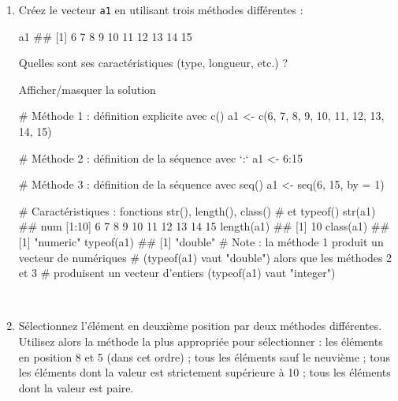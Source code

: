 \documentclass[12pt,]{article}
\newenvironment{Shaded}{}{}
\newcommand{\KeywordTok}[1]{\textcolor[rgb]{0.00,0.00,1.00}{{#1}}}
\newcommand{\DataTypeTok}[1]{{#1}}
\newcommand{\DecValTok}[1]{{#1}}
\newcommand{\StringTok}[1]{\textcolor[rgb]{0.00,0.50,0.50}{{#1}}}
\newcommand{\CommentTok}[1]{\textcolor[rgb]{0.00,0.50,0.00}{{#1}}}
\newcommand{\NormalTok}[1]{{#1}}
\begin{document}
\begin{enumerate}
\def\labelenumi{\alph{enumi}.}
\item
  Créez le vecteur \texttt{a1} en utilisant trois méthodes différentes :

\begin{Shaded}
\begin{Highlighting}[]
\NormalTok{a1}
\NormalTok{##  [1]  6  7  8  9 10 11 12 13 14 15}
\end{Highlighting}
\end{Shaded}

  Quelles sont ses caractéristiques (type, longueur, etc.) ?

  Afficher/masquer la solution

  \hypertarget{sol1}{}
\begin{Shaded}
\begin{Highlighting}[]
\CommentTok{# Méthode 1 : définition explicite avec c()}
\NormalTok{a1 <-}\StringTok{ }\KeywordTok{c}\NormalTok{(}\DecValTok{6}\NormalTok{, }\DecValTok{7}\NormalTok{, }\DecValTok{8}\NormalTok{, }\DecValTok{9}\NormalTok{, }\DecValTok{10}\NormalTok{, }\DecValTok{11}\NormalTok{, }\DecValTok{12}\NormalTok{, }\DecValTok{13}\NormalTok{, }\DecValTok{14}\NormalTok{, }\DecValTok{15}\NormalTok{)}

\CommentTok{# Méthode 2 : définition de la séquence avec `:`}
\NormalTok{a1 <-}\StringTok{ }\DecValTok{6}\NormalTok{:}\DecValTok{15}

\CommentTok{# Méthode 3 : définition de la séquence avec seq()}
\NormalTok{a1 <-}\StringTok{ }\KeywordTok{seq}\NormalTok{(}\DecValTok{6}\NormalTok{, }\DecValTok{15}\NormalTok{, }\DataTypeTok{by =} \DecValTok{1}\NormalTok{)}

\CommentTok{# Caractéristiques : fonctions str(), length(), class()}
\CommentTok{# et typeof()}
\KeywordTok{str}\NormalTok{(a1)}
\NormalTok{##  num [1:10] 6 7 8 9 10 11 12 13 14 15}
\KeywordTok{length}\NormalTok{(a1)}
\NormalTok{## [1] 10}
\KeywordTok{class}\NormalTok{(a1)}
\NormalTok{## [1] "numeric"}
\KeywordTok{typeof}\NormalTok{(a1)}
\NormalTok{## [1] "double"}
\CommentTok{# Note : la méthode 1 produit un vecteur de numériques}
\CommentTok{# (typeof(a1) vaut "double") alors que les méthodes 2 et 3 }
\CommentTok{# produisent un vecteur d'entiers (typeof(a1) vaut "integer")}
\end{Highlighting}
\end{Shaded}

  ~
\item
  Sélectionnez l'élément en deuxième position par deux méthodes
  différentes. Utilisez alors la méthode la plus appropriée pour
  sélectionner : les éléments en position 8 et 5 (dans cet ordre) ; tous
  les éléments sauf le neuvième ; tous les éléments dont la valeur est
  strictement supérieure à 10 ; tous les éléments dont la valeur est
  paire.


\end{enumerate}
\end{document}
